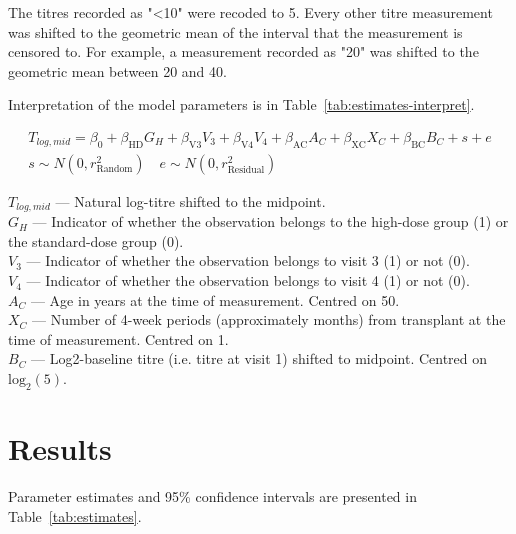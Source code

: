 \documentclass[11pt]{article}
\begin{document}
The titres recorded as "<10" were recoded to 5. Every other titre measurement
was shifted to the geometric mean of the interval that the measurement
is censored to. For example, a measurement recorded as "20" was shifted to the
geometric mean between 20 and 40.

Interpretation of the model parameters is in
Table~\ref{tab:estimates-interpret}.

\begin{equation}
    \begin{gathered}
        \label{eq:model}
        T_{log,mid} = \beta_0 + \beta_{\text{HD}}G_H + \beta_{\text{V3}}V_3
        + \beta_{\text{V4}}V_4 + \beta_{\text{AC}}A_C
        + \beta_{\text{XC}}X_C + \beta_{\text{BC}}B_C
        + s + e\\
        s \sim N(0, r^2_{\text{Random}}) \quad e \sim N(0, r^2_{\text{Residual}})
    \end{gathered}
\end{equation}

$T_{log,mid}$ --- Natural log-titre shifted to the midpoint.\\
$G_H$ --- Indicator of whether the observation belongs to the
high-dose group (1) or the standard-dose group (0).\\
$V_3$ --- Indicator of whether the observation belongs to
visit 3 (1) or not (0).\\
$V_4$ --- Indicator of whether the observation belongs to
visit 4 (1) or not (0).\\
$A_C$ --- Age in years at the time of measurement. Centred on 50.\\
$X_C$ --- Number of 4-week periods (approximately months)
from transplant at the time of measurement. Centred on 1.\\
$B_C$ --- Log2-baseline titre (i.e. titre at visit 1) shifted to midpoint.
Centred on $\text{log}_2(5)$.

\section{Results}

Parameter estimates and 95\% confidence intervals
are presented in Table~\ref{tab:estimates}.




\end{document}
